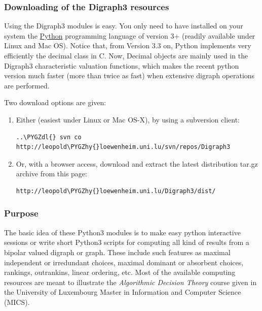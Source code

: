 \documentclass[letterpaper,10pt,english]{sphinxmanual}
\def\PYGZdl{\char`\$}
\def\PYGZhy{\char`\-}
\begin{document}
\subsubsection{Downloading of the Digraph3 resources}
\label{tutorial:downloading-of-the-digraph3-resources}
Using the Digraph3 modules is easy. You only need to have installed on your system the \href{https://www.python.org/doc/}{Python} programming language of version 3+ (readily available under Linux and Mac OS). Notice that, from Version 3.3 on, Python implements very efficiently the decimal class in C. Now, Decimal objects are mainly used in the Digraph3 characteristic valuation functions, which makes the recent python version much faster (more than twice as fast) when extensive digraph operations are performed.

Two download options are given:
\begin{enumerate}
\item {} 
Either (easiest under Linux or Mac OS-X), by using a subversion client:

\begin{Verbatim}[commandchars=\\\{\}]
..\PYGZdl{} svn co http://leopold\PYGZhy{}loewenheim.uni.lu/svn/repos/Digraph3
\end{Verbatim}

\item {} 
Or, with a browser access, download and extract the latest distribution tar.gz archive from this page:

\begin{Verbatim}[commandchars=\\\{\}]
http://leopold\PYGZhy{}loewenheim.uni.lu/Digraph3/dist/
\end{Verbatim}

\end{enumerate}


\subsubsection{Purpose}
\label{tutorial:purpose}
The basic idea of these Python3 modules is to make easy python interactive sessions or write short Python3 scripts for computing all kind of results from a bipolar valued digraph or graph. These include such features as maximal independent or irredundant choices, maximal dominant or absorbent choices, rankings, outrankins, linear ordering, etc. Most of the available computing resources are meant to illustrate the \emph{Algorithmic Decision Theory} course given in the University of Luxembourg Master in Information and Computer Science (MICS).
\end{document}

